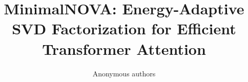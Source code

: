 \title{\textbf{MinimalNOVA: Energy-Adaptive SVD Factorization for Efficient Transformer Attention}}

\author{Anonymous authors}
